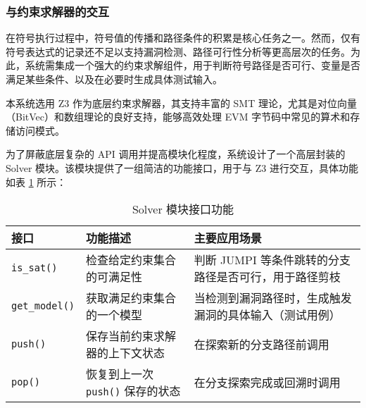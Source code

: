 \documentclass[print, master, vlined, timesmath]{DissertUESTC}
\begin{document}




\subsubsection{与约束求解器的交互}
在符号执行过程中，符号值的传播和路径条件的积累是核心任务之一。然而，仅有符号表达式的记录还不足以支持漏洞检测、路径可行性分析等更高层次的任务。为此，系统需集成一个强大的约束求解组件，用于判断符号路径是否可行、变量是否满足某些条件、以及在必要时生成具体测试输入。

本系统选用 Z3 作为底层约束求解器，其支持丰富的 SMT 理论，尤其是对位向量（BitVec）和数组理论的良好支持，能够高效处理 EVM 字节码中常见的算术和存储访问模式。

为了屏蔽底层复杂的 API 调用并提高模块化程度，系统设计了一个高层封装的 Solver 模块。该模块提供了一组简洁的功能接口，用于与 Z3 进行交互，具体功能如表 \ref{tab:solver_interface} 所示：


\begin{table}[h]
    \centering
    \caption{Solver 模块接口功能}
    \begin{tabularx}{\linewidth}{ll >{\RaggedRight}X}
        \toprule
        \textbf{接口} & \textbf{功能描述} & \textbf{主要应用场景} \\
        \midrule
        \texttt{is\_sat()} & 检查给定约束集合的可满足性 & 判断 JUMPI 等条件跳转的分支路径是否可行，用于路径剪枝 \\
        \addlinespace %
        \texttt{get\_model()} & 获取满足约束集合的一个模型 & 当检测到漏洞路径时，生成触发漏洞的具体输入（测试用例） \\
        \addlinespace %
        \texttt{push()} & 保存当前约束求解器的上下文状态 & 在探索新的分支路径前调用 \\
        \addlinespace %
        \texttt{pop()} & 恢复到上一次 \texttt{push()} 保存的状态 & 在分支探索完成或回溯时调用 \\
        \bottomrule
    \end{tabularx} %
    \label{tab:solver_interface}
\end{table}
\end{document}

